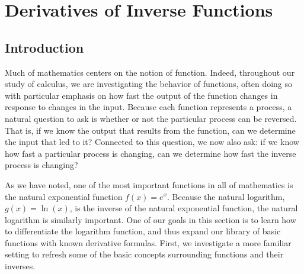 \section{Derivatives of Inverse Functions} \label{S:2.6.Inverse}

\vspace*{-14 pt}

\subsection*{Introduction}

Much of mathematics centers on the notion of function.  Indeed, throughout our study of calculus, we are investigating the behavior of functions, often doing so with particular emphasis on how fast the output of the function changes in response to changes in the input.  Because each function represents a process, a natural question to ask is whether or not the particular process can be reversed.  That is, if we know the output that results from the function, can we determine the input that led to it?  Connected to this question, we now also ask: if we know how fast a particular process is changing, can we determine how fast the inverse process is changing?

As we have noted, one of the most important functions in all of mathematics is the natural exponential function $f(x) = e^x$.  Because the natural logarithm, $g(x) = \ln(x)$, is the inverse of the natural exponential function, the natural logarithm is similarly important.  One of our goals in this section is to learn how to differentiate the logarithm function, and thus expand our library of basic functions with known derivative formulas.  First, we investigate a more familiar setting to refresh some of the basic concepts surrounding functions and their inverses.



